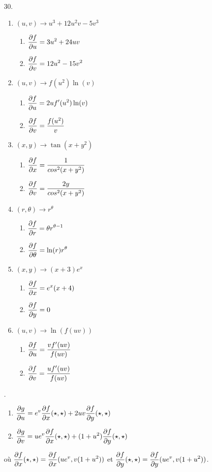 30.
\begin{enumerate}
\item $(u,v)\rightarrow  u^3+12u^2v-5v^3$\\
\begin{enumerate}
\item $\dst{\dfdu = 3u^2+24uv}$
\item $\dst{\dfdv = 12u^2-15v^2}$
\end{enumerate}
\item $(u,v)\rightarrow  f(u^2)\ln(v)$\\
\begin{enumerate}
\item $\dst{\dfdu = 2uf'(u^2)\ln(v)}$
\item $\dst{\dfdv = \f{f(u^2)}{v}}$
\end{enumerate}
\item $(x,y)\rightarrow \tan(x+y^2)$\\
\begin{enumerate}
\item $\dst{\dfdx =\f{1}{cos^2(x+y^2)}}$
\item $\dst{\dfdv = \f{2y}{cos^2(x+y^2)}}$
\end{enumerate}
\item $(r,\theta)\rightarrow  r^\theta$
\begin{enumerate}
\item $\dst{\dfdr =\theta r^{\theta-1}}$
\item $\dst{\dfdth =\ln(r)r^\theta}$
\end{enumerate}
\item $(x,y)\rightarrow (x+3)e^x$
\begin{enumerate}
\item $\dst{\dfdx =e^x(x+4)}$
\item $\dst{\dfdy =0}$
\end{enumerate}
\item $(u,v)\rightarrow  \ln(f(uv)) $\\

\begin{enumerate}
\item $\dst{\dfdu = \f{vf'(uv)}{f(uv)}}$
\item $\dst{\dfdv = \f{uf'(uv)}{f(uv)}}$
\end{enumerate}\pagebreak
\end{enumerate}

.
\begin{enumerate}
\item $\dst{\dgdu = e^v\dfdx(\star,\star)+2uv\dfdy(\star,\star)}$
\item $\dst{\dgdv = ue^v\dfdx(\star,\star)+(1+u^2)\dfdy(\star,\star)}$
\end{enumerate}
o\`{u} $\dst{\dfdx(\star,\star) = \dfdx(ue^v,v(1+u^2))}$ et $\dst{\dfdy(\star,\star) = \dfdy(ue^v,v(1+u^2))}$.

